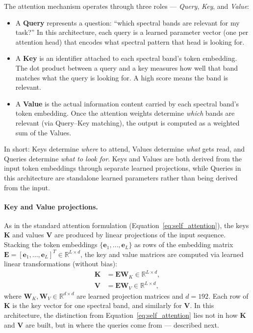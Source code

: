 \documentclass[11pt]{report}
\newcommand{\R}{\mathbb{R}}
\begin{document}
The attention mechanism operates through three roles --- \emph{Query}, \emph{Key}, and \emph{Value}:
\begin{itemize}[nosep]
  \item A \textbf{Query} represents a question: ``which spectral bands are relevant for my task?''
   In this architecture, each query is a learned parameter vector (one per attention head) that encodes what spectral pattern that head is looking for.
  \item A \textbf{Key} is an identifier attached to each spectral band's token embedding. 
  The dot product between a query and a key measures how well that band matches what the query is looking for. A high score means the band is relevant.
  \item A \textbf{Value} is the actual information content carried by each spectral band's token embedding. 
  Once the attention weights determine \emph{which} bands are relevant (via Query--Key matching), the output is computed as a weighted sum of the Values.
\end{itemize}
In short: Keys determine \emph{where} to attend, Values determine \emph{what} gets read, and Queries determine \emph{what to look for}. 
Keys and Values are both derived from the input token embeddings through separate learned projections, while Queries in this architecture are standalone learned parameters rather than being derived from the input.

\paragraph{Key and Value projections.}
As in the standard attention formulation (Equation~\ref{eq:self_attention}), the keys $\mathbf{K}$ and values $\mathbf{V}$ are produced by linear projections of the input sequence. Stacking the token embeddings $\{\mathbf{e}_1, \ldots, \mathbf{e}_L\}$ as rows of the embedding matrix $\mathbf{E} = [\mathbf{e}_1, \ldots, \mathbf{e}_L]^T \in \R^{L \times d}$, the key and value matrices are computed via learned linear transformations (without bias):
\begin{align}
\mathbf{K} &= \mathbf{E}\mathbf{W}_K \in \R^{L \times d}, \label{eq:key_proj} \\
\mathbf{V} &= \mathbf{E}\mathbf{W}_V \in \R^{L \times d}, \label{eq:val_proj}
\end{align}
where $\mathbf{W}_K, \mathbf{W}_V \in \R^{d \times d}$ are learned projection matrices and $d = 192$. Each row of $\mathbf{K}$ is the key vector for one spectral band, and similarly for $\mathbf{V}$. In this architecture, the distinction from Equation~\ref{eq:self_attention} lies not in how $\mathbf{K}$ and $\mathbf{V}$ are built, but in where the queries come from --- described next.
\end{document}
